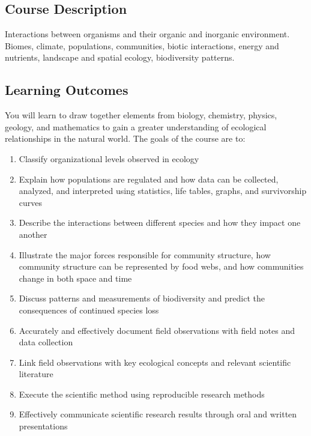 \documentclass{tufte-handout}
\begin{document}
\begin{fullwidth}

\section{Course Description}

Interactions between organisms and their organic and inorganic environment. Biomes, climate, populations, communities, biotic interactions, energy and nutrients, landscape and spatial ecology, biodiversity patterns.

\subsection{Learning Outcomes}

You will learn to draw together elements from biology, chemistry, physics, geology, and mathematics to gain a greater understanding of ecological relationships in the natural world. The goals of the course are to:


\begin{enumerate}
	\item Classify organizational levels observed in ecology
	\item Explain how populations are regulated and how data can be collected, analyzed, and interpreted using statistics, life tables, graphs, and survivorship curves
	\item Describe the interactions between different species and how they impact one another
	\item Illustrate the major forces responsible for community structure, how community structure can be represented by food webs, and how communities change in both space and time
	\item Discuss patterns and measurements of biodiversity and predict the consequences of continued species loss
	\item Accurately and effectively document field observations with field notes and data collection
	\item Link field observations with key ecological concepts and relevant scientific literature
	\item Execute the scientific method using reproducible research methods
	\item Effectively communicate scientific research results through oral and written presentations
\end{enumerate}


\end{fullwidth}
\end{document}
